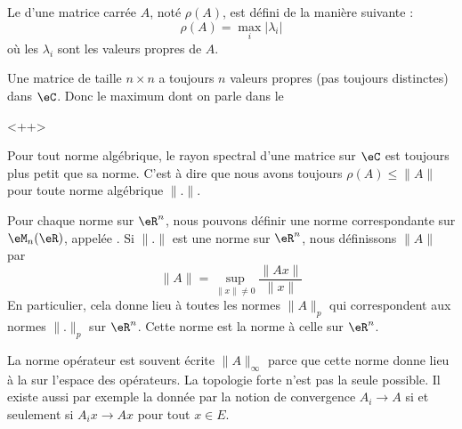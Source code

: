 \begin{definition}      \label{DEFooEAUKooSsjqaL}
    Le  d'une matrice carrée $A$, noté $\rho(A)$, est défini de la manière suivante :
    \begin{equation}
        \rho(A)=\max_i|\lambda_i|
    \end{equation}
    où les $\lambda_i$ sont les valeurs propres de $A$.
\end{definition}

\begin{remark}
    Une matrice de taille \( n\times n\) a toujours \( n\) valeurs propres (pas toujours distinctes) dans \( \eC\). Donc le maximum dont on parle dans le 
\end{remark}
<++>

\begin{proposition}     \label{PROPooCCPRooZLJiRs}
    Pour tout norme algébrique, le rayon spectral d'une matrice sur \( \eC\) est toujours plus petit que sa norme. C'est à dire que nous avons toujours \( \rho(A)\leq \| A \|\) pour toute norme algébrique \( \| . \|\).
\end{proposition}

\begin{definition}     \label{DEFooYDFVooSMgvsD}    
    Pour chaque norme sur \( \eR^n\), nous pouvons définir une norme correspondante sur \( \eM_n(\eR)\), appelée . Si \( \| . \|\) est une norme sur \( \eR^n\), nous définissons \( \| A \|\) par
    \begin{equation}\label{EqThUCEJ}
        \|A\|=\sup_{\|x\|\neq 0}\frac{\|Ax\|}{\|x\|}
    \end{equation}
    En particulier, cela donne lieu à toutes les normes \( \| A \|_p\) qui correspondent aux normes \( \| . \|_p\) sur \( \eR^n\). Cette norme est la norme  à celle sur \( \eR^n\).
\end{definition}

La norme opérateur est souvent écrite \( \| A \|_{\infty}\) parce que cette norme donne lieu à la  sur l'espace des opérateurs. La topologie forte n'est pas la seule possible. Il existe aussi par exemple la  donnée par la notion de convergence \( A_i\to A\) si et seulement si \( A_ix\to Ax\) pour tout \( x\in E\).

